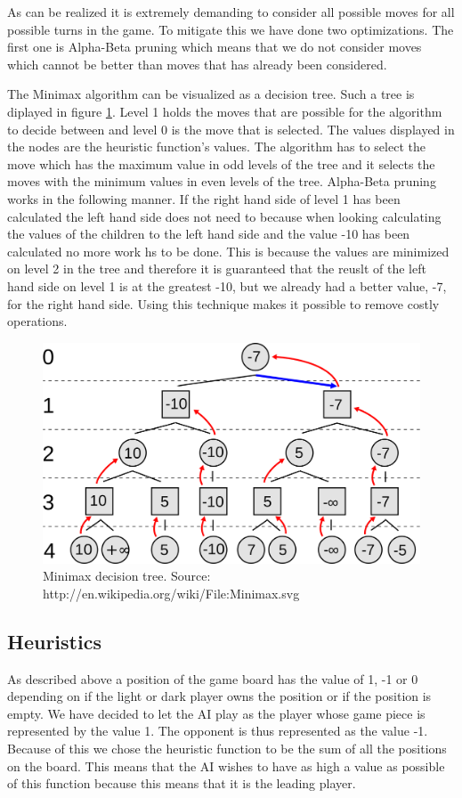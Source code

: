 \documentclass[a4paper]{article}
\begin{document}
As can be realized it is extremely demanding to consider all possible moves for all possible turns in the game. To mitigate this we have done two optimizations. The first one is Alpha-Beta pruning which means that we do not consider moves which cannot be better than moves that has already been considered.

The Minimax algorithm can be visualized as a decision tree. Such a tree is diplayed in figure \ref{minimax}. Level 1 holds the moves that are possible for the algorithm to decide between and level 0 is the move that is selected. The values displayed in the nodes are the heuristic function's values. The algorithm has to select the move which has the maximum value in odd levels of the tree and it selects the moves with the minimum values in even levels of the tree. Alpha-Beta pruning works in the following manner. If the right hand side of level 1 has been calculated the left hand side does not need to because when looking calculating the values of the children to the left hand side and the value -10 has been calculated no more work hs to be done. This is because the values are minimized on level 2 in the tree and therefore it is guaranteed that the reuslt of the left hand side on level 1 is at the greatest -10, but we already had a better value, -7, for the right hand side. Using this technique makes it possible to remove costly operations.

\begin{figure}[h!]
  \centering
    \includegraphics[width=1\textwidth]{Minimax.png}
  \caption{Minimax decision tree. Source: http://en.wikipedia.org/wiki/File:Minimax.svg}
  \label{minimax}
\end{figure}

\subsection{Heuristics}
As described above a position of the game board has the value of 1, -1 or 0 depending on if the light or dark player owns the position or if the position is empty. We have decided to let the AI play as the player whose game piece is represented by the value 1. The opponent is thus represented as the value -1. Because of this we chose the heuristic function to be the sum of all the positions on the board. This means that the AI wishes to have as high a value as possible of this function because this means that it is the leading player.
\end{document}
